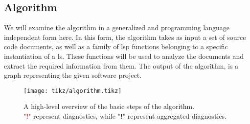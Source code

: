 \documentclass[../thesis]{subfiles}
\begin{document}
\subsection{Algorithm}

We will examine the algorithm in a generalized and programming language independent form here.
In this form, the algorithm takes as input a set of source code documents, as well as a family of \gls{lsp} functions belonging to a specific instantiation of a \gls{ls}.
These functions will be used to analyze the documents and extract the required information from them.
The output of the algorithm, is a graph representing the given software project.

\begin{figure}
	\begin{center}
		\texttt{[image: tikz/algorithm.tikz]}
	\end{center}
	\caption{A high-level overview of the basic steps of the algorithm.\\
		"\textcolor{red}{\textbf{!}}" represent diagnostics, while "\textcolor{red!30}{\textbf{!}}" represent aggregated diagnostics.
	}\label{fig:alg_overview}
\end{figure}
\end{document}
